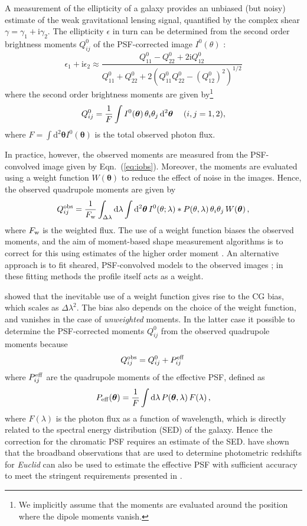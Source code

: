 \documentclass[useAMS,usenatbib]{mnras}
\renewcommand{\d}{\mathrm{d}}
\newcommand{\ii}{\mathrm{i}}
\newcommand{\be}{\begin{equation}}
\newcommand{\ee}{\end{equation}}
\def\elabel#1{\label{eq:#1}}
\begin{document}
A measurement of the ellipticity of a galaxy provides an unbiased (but noisy) estimate of the 
weak gravitational lensing signal, quantified by the complex shear $\gamma=\gamma_1+\ii\gamma_2$.
The ellipticity $\epsilon$ in turn can be determined from the second order brightness moments $Q^0_{ij}$ of the PSF-corrected image $I^0(\theta)$ \citep{2001PhR...340..291B}:
%
\be
\epsilon_1+\ii \epsilon_2 \approx \frac{Q^0_{11} - Q^0_{22} + 2 \ii Q^0_{12} }
{Q^0_{11} + Q^0_{22} +2(Q^0_{11}Q^0_{22} - (Q^0_{12})^2)^{1/2}}
\elabel{mshear}
\ee
%
where the second order brightness moments are given by\footnote{We implicitly assume that the moments are evaluated around the position where the dipole moments vanish.}
%
\be
Q^0_{ij} = {1 \over F} \int  I^{0}({\bm \theta})\, \theta_i \theta_j \, \d^2 {\bm \theta} \quad\; (i,j=1,2),
\ee
%
where $F=\int \d^2{{\bm\theta}}  I^{0}({\bm\theta})$ is the total observed photon flux.

In practice, however, the observed moments are measured from the PSF-convolved image given by
Eqn.~(\ref{eq:iobs}). Moreover, the moments are evaluated using a weight function $W({\bm\theta})$  to reduce the effect of noise in the images. Hence, the observed quadrupole moments are given by
\be
Q^{\rm obs}_{ij} = {1 \over F_{\rm w}} \int_{\Delta\lambda} \d\lambda \int \d^2 {\bm\theta} \,
I^0(\theta; \lambda) *  P(\theta,\lambda)\, \theta_i \theta_j \, W({\bm \theta})\,,
\ee
%
where $F_{\rm w}$ is the weighted flux. The use of a weight function biases the observed moments, 
and the aim of moment-based shape measurement algorithms is to correct for this using estimates of the higher order moment \citep[e.g.][]{Kaiser1995,Melchior11}. An alternative approach is to fit sheared, PSF-convolved models to the observed images 
\citep[e.g.][]{Bridle02,Miller13}; in these fitting methods the profile itself acts as a weight. 

 showed that the inevitable use of a weight function gives rise to the CG bias, which
scales as $\Delta\lambda^2$. The bias also depends on the choice of the weight function,
and vanishes in the case of {\it unweighted} moments. In the latter case it possible to determine the PSF-corrected moments $Q^0_{ij}$ from the observed quadrupole moments because
%
\be
Q^{\rm obs}_{ij}=Q^0_{ij}+P^{\rm eff}_{ij} \,
\ee
%
where $P^{\rm eff}_{ij}$ are the quadrupole moments of the effective PSF,  defined as
\be
P_{\rm eff}({\bm \theta}) = \frac{1}{F} \int \d \lambda\, P({\bm \theta},\lambda)\, F(\lambda) \,,
\ee
where   $F(\lambda)$ is the photon flux as a function of wavelength, which is directly related to the spectral energy distribution (SED) of the galaxy. Hence the correction for the chromatic PSF requires an estimate of the SED.  \cite{Eriksen17} have shown that the broadband observations that are used to determine photometric redshifts for {\it Euclid} can also be used to estimate the effective PSF with sufficient accuracy to meet the stringent requirements presented in \cite{Cropper13}.
\end{document}
